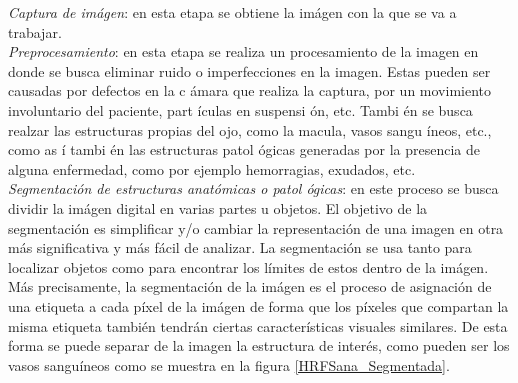 \textit{Captura de im\'agen}: en esta etapa se obtiene la im\'agen con la que se va a trabajar.\\
\textit{Preprocesamiento}: en esta etapa se realiza un procesamiento de la imagen en donde se busca eliminar ruido o imperfecciones en la imagen. Estas pueden ser causadas por defectos en la c \'amara que realiza la captura, por un movimiento involuntario del paciente, part \'iculas en suspensi \'on, etc. Tambi \'en se busca realzar las estructuras propias del ojo, como la macula, vasos sangu \'ineos, etc.,  como as \'i tambi \'en las estructuras patol \'ogicas generadas por la presencia de alguna enfermedad, como por ejemplo hemorragias, exudados, etc.\\ 
\textit{Segmentaci\'on de estructuras anat\'omicas  o patol \'ogicas}: en este proceso se busca dividir la im\'agen digital en varias partes u objetos. El objetivo de la segmentación es simplificar y/o cambiar la representaci\'on de una imagen en otra m\'as significativa y m\'as f\'acil de analizar. La segmentaci\'on se usa tanto para localizar objetos como para encontrar los l\'imites de estos dentro de la im\'agen. M\'as precisamente, la segmentaci\'on de la im\'agen es el proceso de asignaci\'on de una etiqueta a cada p\'ixel de la im\'agen de forma que los p\'ixeles que compartan la misma etiqueta tambi\'en tendr\'an ciertas caracter\'isticas visuales similares. De esta forma se puede separar de la imagen la estructura de inter\'es, como pueden ser los vasos sangu\'ineos como se muestra en la figura \ref{HRFSana_Segmentada}.

